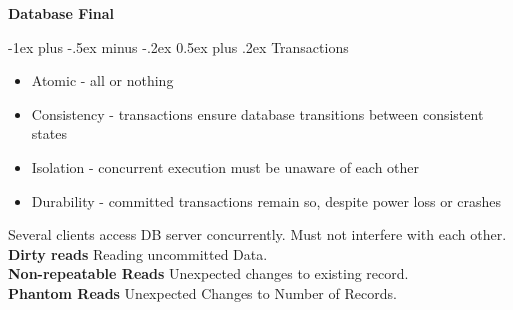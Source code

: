 \documentclass[10pt,landscape]{article}
\makeatletter
\renewcommand{\section}{\@startsection{section}{1}{0mm}%
                                {-1ex plus -.5ex minus -.2ex}%
                                {0.5ex plus .2ex}%
                                {\normalfont\large\bfseries}}
\makeatother
\begin{document}
\raggedright
\footnotesize
\begin{multicols}{3}


\setlength{\premulticols}{1pt}
\setlength{\postmulticols}{1pt}
\setlength{\multicolsep}{1pt}
\setlength{\columnsep}{2pt}

 
\begin{center}
     \Large{\textbf{Database Final}} \\
\end{center}


\section{Transactions}
\begin{itemize}
    \item Atomic - all or nothing
    \item Consistency - transactions ensure database transitions between consistent states
    \item Isolation - concurrent execution must be unaware of each other
    \item Durability - committed transactions remain so, despite power loss or crashes
\end{itemize}



Several clients access DB server concurrently. Must not interfere with each other.\\
\textbf{Dirty reads} Reading uncommitted Data.\\
\textbf{Non-repeatable Reads }Unexpected changes to existing record.\\
\textbf{Phantom Reads} Unexpected Changes to Number of Records.\\





\end{multicols}
\end{document}
